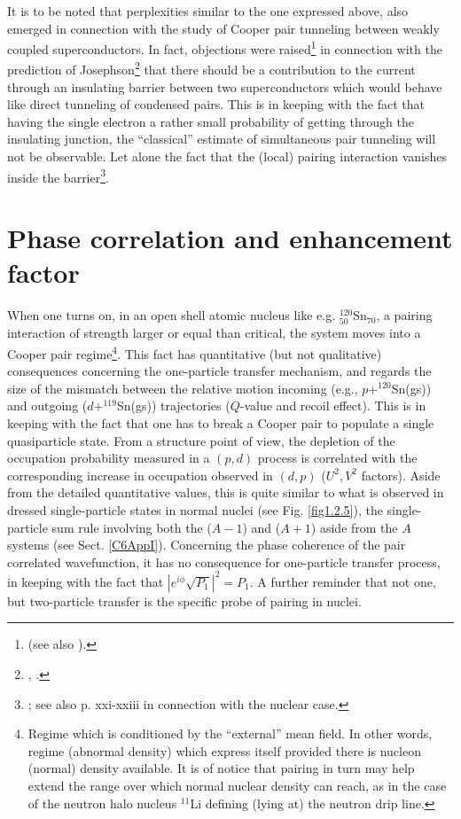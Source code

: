 It is to be noted that  perplexities similar to the one expressed above,  also emerged in connection with the study  of Cooper pair tunneling between weakly coupled superconductors. In fact, objections were raised\footnote{\cite{Bardeen:62,Bardeen:61} (see also \cite{Pippard:12,Cohen:62,McDonald:01}).}   in connection with the prediction of Josephson\footnote{\cite{Josephson:62}, \cite{Anderson:64b}.} that there should be a contribution to the current through an insulating barrier between two superconductors which would behave like direct tunneling of condensed pairs. This is in keeping with the fact that having the single electron a rather small probability of getting through the insulating junction,  the ``classical'' estimate of simultaneous pair tunneling will not be observable. Let alone the fact that the (local) pairing interaction vanishes inside the barrier\footnote{\cite{Anderson:70};  see also \cite{Broglia:19d} p. xxi-xxiii in connection with the nuclear case.}.


\section{Phase correlation and enhancement factor}\label{S4.3}
When one turns on, in an open shell atomic nucleus like e.g. $^{120}_{50}$Sn$_{70}$, a pairing interaction of strength larger or equal than critical, the system moves into a Cooper pair regime\footnote{Regime which is conditioned by the ``external'' mean field. In other words, regime (abnormal density) which express itself provided there is nucleon (normal) density available. It is of notice that pairing in turn may help extend the range over which normal nuclear density can reach, as in the case of the neutron halo nucleus $^{11}$Li  defining (lying at) the neutron drip line.}. This fact has quantitative (but not qualitative)  consequences concerning the one-particle transfer mechanism,  and regards the size of the mismatch between the relative motion incoming (e.g.,  $p+^{120}$Sn(gs)) and outgoing ($d+^{119}$Sn(gs)) trajectories ($Q$-value and recoil effect). This is in keeping with the fact that one has to break a Cooper pair to populate a single  quasiparticle state. From a structure point of view, the depletion of the occupation probability measured in a $(p,d)$ process is correlated with the corresponding increase in occupation observed in $(d,p)$ ($U^2,V^2$ factors). Aside  from the detailed quantitative values, this is quite similar to what is observed in dressed single-particle states in normal nuclei (see Fig. \ref{fig1.2.5}), the single-particle sum rule involving both the ($A-1$) and ($A+1$) aside from the $A$ systems (see Sect. \ref{C6AppI}). Concerning the phase coherence of the pair correlated wavefunction, it has no consequence for one-particle transfer process, in keeping with the fact that $|e^{i\phi}\sqrt{P_1}|^2=P_1$. A further reminder  that not one, but two-particle transfer is the specific probe of pairing in nuclei.




